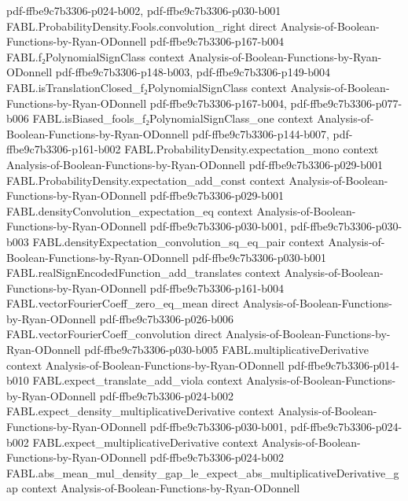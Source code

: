 \begin{theorem}
  {pdf-ffbe9c7b3306-p024-b002,
    pdf-ffbe9c7b3306-p030-b001}
\proofstep
  {FABL.ProbabilityDensity.Fools.convolution_right}
  {direct}
  {Analysis-of-Boolean-Functions-by-Ryan-ODonnell}
  {pdf-ffbe9c7b3306-p167-b004}
\proofstep
  {FABL.f₂PolynomialSignClass}
  {context}
  {Analysis-of-Boolean-Functions-by-Ryan-ODonnell}
  {pdf-ffbe9c7b3306-p148-b003,
    pdf-ffbe9c7b3306-p149-b004}
\proofstep
  {FABL.isTranslationClosed_f₂PolynomialSignClass}
  {context}
  {Analysis-of-Boolean-Functions-by-Ryan-ODonnell}
  {pdf-ffbe9c7b3306-p167-b004,
    pdf-ffbe9c7b3306-p077-b006}
\proofstep
  {FABL.isBiased_fools_f₂PolynomialSignClass_one}
  {context}
  {Analysis-of-Boolean-Functions-by-Ryan-ODonnell}
  {pdf-ffbe9c7b3306-p144-b007,
    pdf-ffbe9c7b3306-p161-b002}
\proofstep
  {FABL.ProbabilityDensity.expectation_mono}
  {context}
  {Analysis-of-Boolean-Functions-by-Ryan-ODonnell}
  {pdf-ffbe9c7b3306-p029-b001}
\proofstep
  {FABL.ProbabilityDensity.expectation_add_const}
  {context}
  {Analysis-of-Boolean-Functions-by-Ryan-ODonnell}
  {pdf-ffbe9c7b3306-p029-b001}
\proofstep
  {FABL.densityConvolution_expectation_eq}
  {context}
  {Analysis-of-Boolean-Functions-by-Ryan-ODonnell}
  {pdf-ffbe9c7b3306-p030-b001,
    pdf-ffbe9c7b3306-p030-b003}
\proofstep
  {FABL.densityExpectation_convolution_sq_eq_pair}
  {context}
  {Analysis-of-Boolean-Functions-by-Ryan-ODonnell}
  {pdf-ffbe9c7b3306-p030-b001}
\proofstep
  {FABL.realSignEncodedFunction_add_translates}
  {context}
  {Analysis-of-Boolean-Functions-by-Ryan-ODonnell}
  {pdf-ffbe9c7b3306-p161-b004}
\proofstep
  {FABL.vectorFourierCoeff_zero_eq_mean}
  {direct}
  {Analysis-of-Boolean-Functions-by-Ryan-ODonnell}
  {pdf-ffbe9c7b3306-p026-b006}
\proofstep
  {FABL.vectorFourierCoeff_convolution}
  {direct}
  {Analysis-of-Boolean-Functions-by-Ryan-ODonnell}
  {pdf-ffbe9c7b3306-p030-b005}
\proofstep
  {FABL.multiplicativeDerivative}
  {context}
  {Analysis-of-Boolean-Functions-by-Ryan-ODonnell}
  {pdf-ffbe9c7b3306-p014-b010}
\proofstep
  {FABL.expect_translate_add_viola}
  {context}
  {Analysis-of-Boolean-Functions-by-Ryan-ODonnell}
  {pdf-ffbe9c7b3306-p024-b002}
\proofstep
  {FABL.expect_density_multiplicativeDerivative}
  {context}
  {Analysis-of-Boolean-Functions-by-Ryan-ODonnell}
  {pdf-ffbe9c7b3306-p030-b001,
    pdf-ffbe9c7b3306-p024-b002}
\proofstep
  {FABL.expect_multiplicativeDerivative}
  {context}
  {Analysis-of-Boolean-Functions-by-Ryan-ODonnell}
  {pdf-ffbe9c7b3306-p024-b002}
\proofstep
  {FABL.abs_mean_mul_density_gap_le_expect_abs_multiplicativeDerivative_gap}
  {context}
  {Analysis-of-Boolean-Functions-by-Ryan-ODonnell}

\end{theorem}
